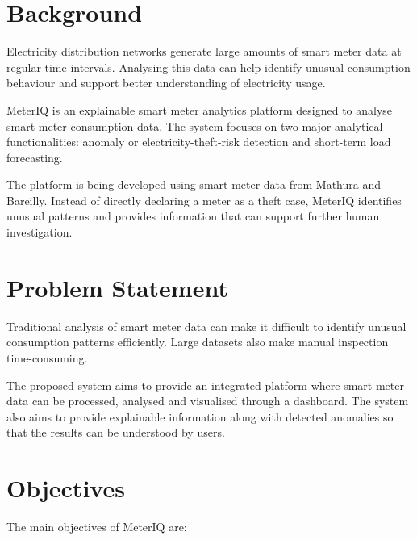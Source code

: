 \documentclass[12pt,a4paper]{report}
\begin{document}

\section{Background}

Electricity distribution networks generate large amounts of smart meter data
at regular time intervals. Analysing this data can help identify unusual
consumption behaviour and support better understanding of electricity usage.

MeterIQ is an explainable smart meter analytics platform designed to analyse
smart meter consumption data. The system focuses on two major analytical
functionalities: anomaly or electricity-theft-risk detection and short-term
load forecasting.

The platform is being developed using smart meter data from Mathura and
Bareilly. Instead of directly declaring a meter as a theft case, MeterIQ
identifies unusual patterns and provides information that can support further
human investigation.


\section{Problem Statement}

Traditional analysis of smart meter data can make it difficult to identify
unusual consumption patterns efficiently. Large datasets also make manual
inspection time-consuming.

The proposed system aims to provide an integrated platform where smart meter
data can be processed, analysed and visualised through a dashboard. The
system also aims to provide explainable information along with detected
anomalies so that the results can be understood by users.


\section{Objectives}

The main objectives of MeterIQ are:
\end{document}
